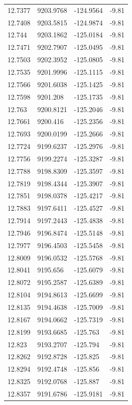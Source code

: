 \begin{table}[H]
\begin{tabular}{llll}
12.7377 & 9203.9768 & -124.9564 & -9.81 \\
12.7408 & 9203.5815 & -124.9874 & -9.81 \\
12.744 & 9203.1862 & -125.0184 & -9.81 \\
12.7471 & 9202.7907 & -125.0495 & -9.81 \\
12.7503 & 9202.3952 & -125.0805 & -9.81 \\
12.7535 & 9201.9996 & -125.1115 & -9.81 \\
12.7566 & 9201.6038 & -125.1425 & -9.81 \\
12.7598 & 9201.208 & -125.1735 & -9.81 \\
12.763 & 9200.8121 & -125.2046 & -9.81 \\
12.7661 & 9200.416 & -125.2356 & -9.81 \\
12.7693 & 9200.0199 & -125.2666 & -9.81 \\
12.7724 & 9199.6237 & -125.2976 & -9.81 \\
12.7756 & 9199.2274 & -125.3287 & -9.81 \\
12.7788 & 9198.8309 & -125.3597 & -9.81 \\
12.7819 & 9198.4344 & -125.3907 & -9.81 \\
12.7851 & 9198.0378 & -125.4217 & -9.81 \\
12.7883 & 9197.6411 & -125.4527 & -9.81 \\
12.7914 & 9197.2443 & -125.4838 & -9.81 \\
12.7946 & 9196.8474 & -125.5148 & -9.81 \\
12.7977 & 9196.4503 & -125.5458 & -9.81 \\
12.8009 & 9196.0532 & -125.5768 & -9.81 \\
12.8041 & 9195.656 & -125.6079 & -9.81 \\
12.8072 & 9195.2587 & -125.6389 & -9.81 \\
12.8104 & 9194.8613 & -125.6699 & -9.81 \\
12.8135 & 9194.4638 & -125.7009 & -9.81 \\
12.8167 & 9194.0662 & -125.7319 & -9.81 \\
12.8199 & 9193.6685 & -125.763 & -9.81 \\
12.823 & 9193.2707 & -125.794 & -9.81 \\
12.8262 & 9192.8728 & -125.825 & -9.81 \\
12.8294 & 9192.4748 & -125.856 & -9.81 \\
12.8325 & 9192.0768 & -125.887 & -9.81 \\
12.8357 & 9191.6786 & -125.9181 & -9.81 \\

\end{tabular}
\end{table}
